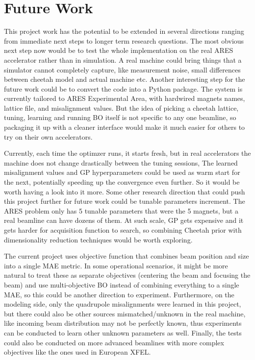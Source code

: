 \section{Future Work}

This project work has the potential to be extended in several directions ranging from
immediate next steps to longer term research questions. The most obvious next step now would be 
to test the whole implementation on the real ARES accelerator rather than in simulation.  
A real machine could bring things that a simulator cannot completely capture, 
like measurement noise, small differences between cheetah model and actual machine etc. 
 Another interesting step 
for the future work could be to convert the code into a Python package. 
The system is currently tailored to ARES Experimental Area, with hardwired magnets names, lattice file, 
and misalignment values. But the idea of picking a cheetah lattice, tuning, learning and running BO 
itself is not specific to any one beamline, so packaging it up with a cleaner interface would 
make it much easier for others to try on their own accelerators.  \

Currently, each time the optimzer runs, it starts fresh, but in real accelerators the machine does not change drastically between the tuning
sessions, The learned misalignment values and GP hyperparameters could be used as warm start for the next,
potentially speeding up the convergence even further. So it would be worth having a look into it more. 
Some other research direction that could push this project further for future work could be 
tunable parameters increment. The ARES problem only has 5 tunable parameters that were the 5 magnets, 
but a real beamline can have dozens of them. At such scale, GP gets expensive and it gets 
harder for acquisition function to search, so combining Cheetah prior with dimensionality 
reduction techniques would be worth exploring. 


The current project uses objective function that combines beam position and size into a single MAE metric.
In some operational scenarios, it might be more natural to treat these as separate objectives 
(centering the beam and focusing the beam) and use multi-objective BO instead of combining everything to a single MAE,
so this could be another direction to experiment. Furthermore, on the modeling side, only the quadrupole misalignments were learned in this project, 
but there could also be other sources mismatched/unknown in the real machine, like incoming 
beam distribution may not be perfectly known, thus experiments can be conducted 
to learn other unknown parameters as well. Finally, the tests could also be conducted on more advanced beamlines with more 
complex objectives like the ones used in European XFEL. 

